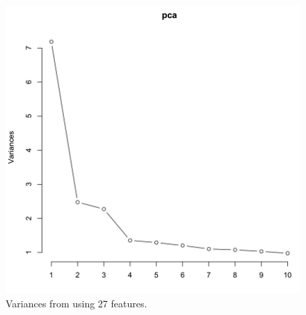 \begin{figure}
\centering
\includegraphics[width=1.0\textwidth]{figures/pca_variances_new.png}
\caption{Variances from using 27 features.}
\label{var_new}
\end{figure}












